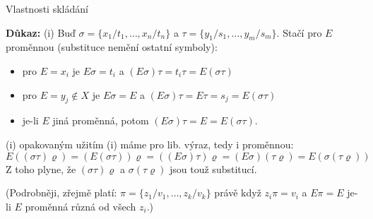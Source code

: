 \documentclass{beamer}
\begin{document}
\begin{frame}{Vlastnosti skládání}


    \medskip

    \textbf{Důkaz:} \alert{(i)} Buď $\sigma=\{x_1/t_1,\dots,x_n/t_n\}$ a $\tau=\{y_1/s_1,\dots,y_m/s_m\}$. Stačí pro $E$ proměnnou (substituce nemění ostatní symboly):
    \begin{itemize}
        \item pro $E=x_i$ je $E\sigma=t_i$ a $(E\sigma)\tau=t_i\tau=E(\sigma\tau)$
        \item pro $E=y_j\notin X$ je $E\sigma=E$ a $(E\sigma)\tau=E\tau=s_j=E(\sigma\tau)$
        \item je-li $E$ jiná proměnná, potom $(E\sigma)\tau=E=E(\sigma\tau)$.
    \end{itemize}
    \alert{(i)} opakovaným užitím (i) máme pro lib. výraz, tedy i proměnnou:
    $$
    E((\sigma\tau)\varrho)=(E(\sigma\tau))\varrho=((E\sigma)\tau)\varrho=(E\sigma)(\tau\varrho)=E(\sigma(\tau\varrho))
    $$
    Z toho plyne, že $(\sigma\tau)\varrho$ a $\sigma(\tau\varrho)$ jsou touž substitucí. 
    
    (Podrobněji, zřejmě platí: $\pi=\{z_1/v_1,\dots,z_k/v_k\}$ právě když $z_i\pi=v_i$ a $E\pi=E$ je-li $E$ proměnná různá od všech $z_i$.) \hfill\qedsymbol
 

\end{frame}
\end{document}
